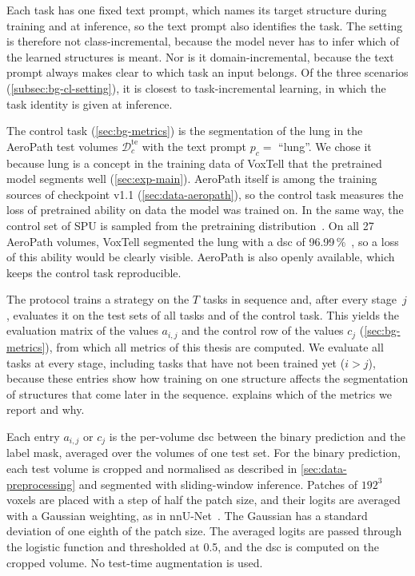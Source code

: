 Each task has one fixed text prompt, which names its target structure during training and at inference, so the text prompt also identifies the task.
The setting is therefore not class-incremental, because the model never has to infer which of the learned structures is meant.
Nor is it domain-incremental, because the text prompt always makes clear to which task an input belongs.
Of the three scenarios (\cref{subsec:bg-cl-setting}), it is closest to task-incremental learning, in which the task identity is given at inference.

The control task (\cref{sec:bg-metrics}) is the segmentation of the lung in the AeroPath test volumes $\mathcal{D}_c^{\mathrm{te}}$ with the text prompt $p_c = $ ``lung''.
We chose it because lung is a concept in the training data of VoxTell that the pretrained model segments well (\cref{sec:exp-main}).
AeroPath itself is among the training sources of checkpoint v1.1 (\cref{sec:data-aeropath}), so the control task measures the loss of pretrained ability on data the model was trained on.
In the same way, the control set of SPU is sampled from the pretraining distribution~\cite[Sec.~3]{Zhang_2024_CVPR}.
On all 27 AeroPath volumes, VoxTell segmented the lung with a \gls{dsc} of 96.99\,\%~\cite[Suppl.~Table~7]{rokuss2025voxtellfreetextpromptableuniversal}, so a loss of this ability would be clearly visible.
AeroPath is also openly available, which keeps the control task reproducible.

The protocol trains a strategy on the $T$ tasks in sequence and, after every stage~$j$, evaluates it on the test sets of all tasks and of the control task.
This yields the evaluation matrix of the values $a_{i,j}$ and the control row of the values $c_j$ (\cref{sec:bg-metrics}), from which all metrics of this thesis are computed.
We evaluate all tasks at every stage, including tasks that have not been trained yet ($i > j$), because these entries show how training on one structure affects the segmentation of structures that come later in the sequence.
 explains which of the metrics we report and why.

Each entry $a_{i,j}$ or $c_j$ is the per-volume \gls{dsc} between the binary prediction and the label mask, averaged over the volumes of one test set.
For the binary prediction, each test volume is cropped and normalised as described in \cref{sec:data-preprocessing} and segmented with sliding-window inference.
Patches of $192^3$ voxels are placed with a step of half the patch size, and their logits are averaged with a Gaussian weighting, as in nnU-Net~\cite{isensee2018nnunetselfadaptingframeworkunetbased}.
The Gaussian has a standard deviation of one eighth of the patch size.
The averaged logits are passed through the logistic function and thresholded at 0.5, and the \gls{dsc} is computed on the cropped volume.
No test-time augmentation is used.

